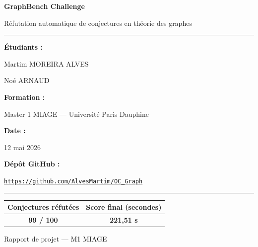 \documentclass[12pt,a4paper]{article}
\begin{document}
\begin{titlepage}
  \centering
  \vspace*{1cm}

  {\Huge\bfseries GraphBench Challenge\par}
  \vspace{0.4cm}
  {\Large Réfutation automatique de conjectures en théorie des graphes\par}

  \vspace{1.5cm}
  \rule{\linewidth}{0.4pt}
  \vspace{0.8cm}

  {\large\bfseries Étudiants :\par}
  \vspace{0.3cm}
  {\large Martim MOREIRA ALVES\par}
  {\large Noé ARNAUD\par}

  \vspace{0.8cm}
  {\large\bfseries Formation :\par}
  {\large Master 1 MIAGE — Université Paris Dauphine\par}

  \vspace{0.8cm}
  {\large\bfseries Date :\par}
  {\large 12 mai 2026\par}

  \vspace{0.8cm}
  {\large\bfseries Dépôt GitHub :\par}
  \href{https://github.com/AlvesMartim/OC_Graph}{\texttt{https://github.com/AlvesMartim/OC\_Graph}}

  \vspace{1.2cm}
  \rule{\linewidth}{0.4pt}
  \vspace{0.8cm}

  \begin{center}
    \begin{tabular}{cc}
      \toprule
      \textbf{Conjectures réfutées} & \textbf{Score final (secondes)} \\
      \midrule
      \textbf{99 / 100} & \textbf{221,51 s} \\
      \bottomrule
    \end{tabular}
  \end{center}

  \vfill
  {\small Rapport de projet — M1 MIAGE}
\end{titlepage}
\end{document}
